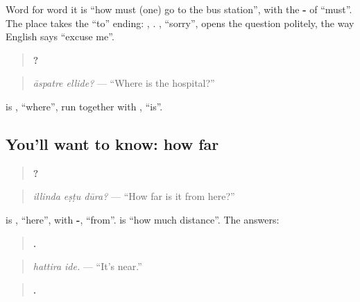 Word for word it is \textquotedblleft{}how must (one) go to the bus station\textquotedblright{}, with the \textbf{-} of \textquotedblleft{}must\textquotedblright{}. The place takes the \textquotedblleft{}to\textquotedblright{} ending: \textbf{}, \textbf{}. \textbf{}, \textquotedblleft{}sorry\textquotedblright{}, opens the question politely, the way English says \textquotedblleft{}excuse me\textquotedblright{}.

\begin{quote}
\textbf{ ?}
\end{quote}

\begin{quote}
\emph{āspatre ellide?} — \textquotedblleft{}Where is the hospital?\textquotedblright{}
\end{quote}

\textbf{} is \textbf{}, \textquotedblleft{}where\textquotedblright{}, run together with \textbf{}, \textquotedblleft{}is\textquotedblright{}.

\subsection*{You'll want to know: how far}
\begin{quote}
\textbf{  ?}
\end{quote}

\begin{quote}
\emph{illinda eṣṭu dūra?} — \textquotedblleft{}How far is it from here?\textquotedblright{}
\end{quote}

\textbf{} is \textbf{}, \textquotedblleft{}here\textquotedblright{}, with \textbf{-}, \textquotedblleft{}from\textquotedblright{}. \textbf{ } is \textquotedblleft{}how much distance\textquotedblright{}. The answers:

\begin{quote}
\textbf{ .}
\end{quote}

\begin{quote}
\emph{hattira ide.} — \textquotedblleft{}It's near.\textquotedblright{}
\end{quote}

\begin{quote}
\textbf{  .}
\end{quote}

